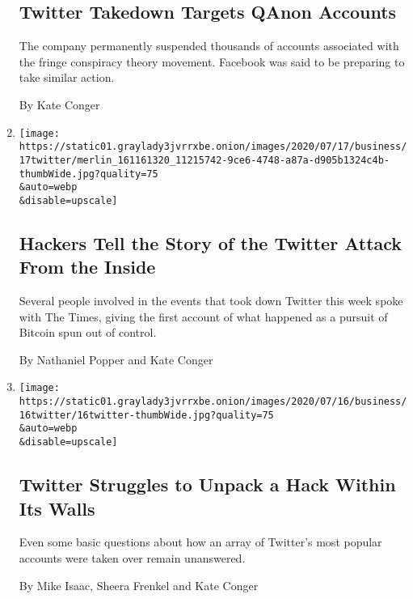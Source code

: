 \begin{enumerate}
  \hypertarget{twitter-takedown-targets-qanon-accounts}{%
  \subsection{Twitter Takedown Targets QAnon
  Accounts}\label{twitter-takedown-targets-qanon-accounts}}

  The company permanently suspended thousands of accounts associated
  with the fringe conspiracy theory movement. Facebook was said to be
  preparing to take similar action.

  By Kate Conger
\item
  \href{/2020/07/17/technology/twitter-hackers-interview.html}{}

  \texttt{[image: https://static01.graylady3jvrrxbe.onion/images/2020/07/17/business/17twitter/merlin\_161161320\_11215742-9ce6-4748-a87a-d905b1324c4b-thumbWide.jpg?quality=75\\\&auto=webp\\\&disable=upscale]}

  \hypertarget{hackers-tell-the-story-of-the-twitter-attack-from-the-inside}{%
  \subsection{Hackers Tell the Story of the Twitter Attack From the
  Inside}\label{hackers-tell-the-story-of-the-twitter-attack-from-the-inside}}

  Several people involved in the events that took down Twitter this week
  spoke with The Times, giving the first account of what happened as a
  pursuit of Bitcoin spun out of control.

  By Nathaniel Popper and Kate Conger
\item
  \href{/2020/07/16/technology/twitter-hack-investigation.html}{}

  \texttt{[image: https://static01.graylady3jvrrxbe.onion/images/2020/07/16/business/16twitter/16twitter-thumbWide.jpg?quality=75\\\&auto=webp\\\&disable=upscale]}

  \hypertarget{twitter-struggles-to-unpack-a-hack-within-its-walls}{%
  \subsection{Twitter Struggles to Unpack a Hack Within Its
  Walls}\label{twitter-struggles-to-unpack-a-hack-within-its-walls}}

  Even some basic questions about how an array of Twitter's most popular
  accounts were taken over remain unanswered.

  By Mike Isaac, Sheera Frenkel and Kate Conger
\end{enumerate}

